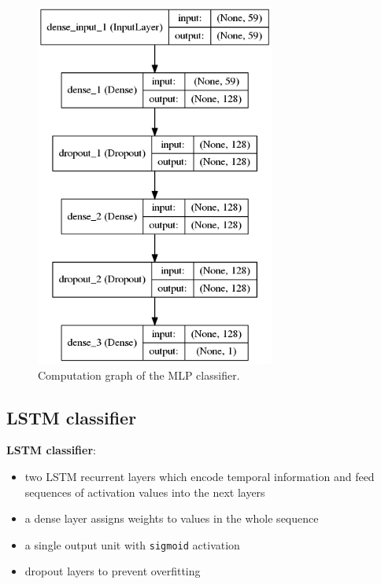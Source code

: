 \documentclass[11pt,a4paper]{report}
\begin{document}
\begin{figure}[htbp]
  \centering
  \includegraphics[width=0.7\textwidth]{model-mlp.png}
  \caption{Computation graph of the MLP classifier.} \label{fig:mlp}
\end{figure}

\newpage

\subsection{LSTM classifier}

\begin{mdframed}
\noindent \textbf{LSTM classifier}:
\begin{itemize}
  \item two LSTM recurrent layers which encode temporal information and feed sequences of activation values into the next layers
  \item a dense layer assigns weights to values in the whole sequence
  \item a single output unit with \texttt{sigmoid} activation
  \item dropout \parencite{srivastava2014dropout} layers to prevent overfitting
\end{itemize}
\end{mdframed}
\end{document}
